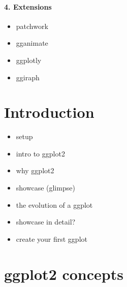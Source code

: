 \documentclass[
]{book}
\providecommand{\tightlist}{%
  \setlength{\itemsep}{0pt}\setlength{\parskip}{0pt}}
\begin{document}
\hypertarget{extensions}{%
\paragraph*{4. Extensions}\label{extensions}}

\begin{itemize}
\tightlist
\item
  patchwork
\item
  gganimate
\item
  ggplotly
\item
  ggiraph
\end{itemize}

\hypertarget{introduction}{%
\section{Introduction}\label{introduction}}

\begin{itemize}
\tightlist
\item
  setup
\item
  intro to ggplot2
\item
  why ggplot2
\item
  showcase (glimpse)
\item
  the evolution of a ggplot
\item
  showcase in detail?
\item
  create your first ggplot
\end{itemize}

\hypertarget{ggplot2-concepts-1}{%
\section{ggplot2 concepts}\label{ggplot2-concepts-1}}
\end{document}

